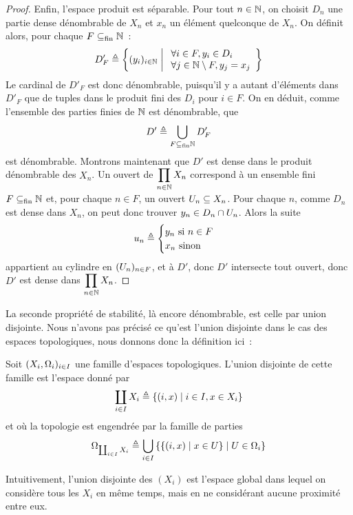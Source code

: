 \begin{proof}
  Enfin, l'espace produit est séparable. Pour tout $n \in \mathbb N$, on choisit
  $D_n$ une partie dense dénombrable de $X_n$ et $x_n$ un élément
  quelconque de $X_n$. On définit alors, pour chaque $F\subseteq_{\mathrm{fin}} \mathbb N$~:
  \[D'_F \triangleq \left\{ (y_i)_{i \in \mathbb N} \;\middle\vert\; \begin{array}{l}
    \forall i \in F, y_i \in D_i\\
    \forall j \in \mathbb N \setminus F, y_j = x_j
  \end{array} \right\}\]
  Le cardinal de $D'_F$ est donc dénombrable, puisqu'il y a autant d'éléments
  dans $D'_F$ que de tuples dans le produit fini des $D_i$ pour $i \in F$. On
  en déduit, comme l'ensemble des parties finies de $\mathbb N$ est dénombrable,
  que
  \[D' \triangleq \bigcup_{F\subseteq_{\mathrm{fin}} \mathbb N} D'_F\]
  est dénombrable. Montrons maintenant que $D'$ est dense dans le produit
  dénombrable des $X_n$. Un ouvert de $\displaystyle\prod_{n \in \mathbb N} X_n$
  correspond à un ensemble fini $F\subseteq_{\mathrm{fin}} \mathbb N$ et, pour chaque $n \in F$, un
  ouvert $U_n \subseteq X_n$. Pour chaque $n$, comme $D_n$ est dense dans
  $X_n$, on peut donc trouver $y_n \in D_n \cap U_n$. Alors la suite
  \[u_n \triangleq \begin{cases} y_n\text{ si } n \in F \\
    x_n \text{ sinon}\end{cases}\]
  appartient au cylindre en $(U_n)_{n \in F}$, et à $D'$, donc $D'$
  intersecte tout ouvert, donc $D'$ est dense dans
  $\displaystyle \prod_{n \in \mathbb N} X_n$.
\end{proof}

La seconde propriété de stabilité, là encore dénombrable, est celle par union
disjointe. Nous n'avons pas précisé ce qu'est l'union disjointe dans le cas des
espaces topologiques, nous donnons donc la définition ici~:

\begin{definition}
  Soit $(X_i,\Omega_i)_{i\in I}$ une famille d'espaces topologiques. L'union
  disjointe de cette famille est l'espace donné par
  \[\coprod_{i\in I} X_i \triangleq \left\{ (i,x) \;\middle\vert\; i\in I, x \in X_i \right\}\]
  et où la topologie est engendrée par la famille de parties
  \[\Omega_{\coprod_{i\in I} X_i}\triangleq
  \bigcup_{i \in I}\left\{ \left\{ (i,x) \;\middle\vert\; x\in U \right\} \;\middle\vert\; U\in\Omega_i \right\}\]
\end{definition}

Intuitivement, l'union disjointe des $(X_i)$ est l'espace global dans lequel
on considère tous les $X_i$ en même temps, mais en ne considérant aucune
proximité entre eux.

